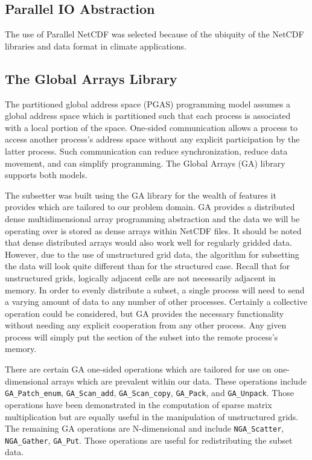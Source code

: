 \subsection{Parallel IO Abstraction}

The use of Parallel NetCDF was selected because of the ubiquity of the NetCDF
libraries and data format in climate applications.

\subsection{The Global Arrays Library}

The partitioned global address space (PGAS) programming model assumes a global
address space which is partitioned such that each process is associated with a
local portion of the space.  One-sided communication allows a process to
access another process's address space without any explicit participation by
the latter process.  Such communication can reduce synchronization, reduce
data movement, and can simplify programming.  The Global Arrays (GA) library
supports both models.

The subsetter was built using the GA library for the wealth of features it
provides which are tailored to our problem domain.  GA provides a distributed
dense multidimensional array programming abstraction and the data we will be
operating over is stored as dense arrays within NetCDF files.  It should be
noted that dense distributed arrays would also work well for regularly gridded
data.  However, due to the use of unstructured grid data, the algorithm for
subsetting the data will look quite different than for the structured case.
Recall that for unstructured grids, logically adjacent cells are not
necessarily adjacent in memory.  In order to evenly distribute a subset, a
single process will need to send a varying amount of data to any number of
other processes.  Certainly a collective operation could be considered, but GA
provides the necessary functionality without needing any explicit cooperation
from any other process.  Any given process will simply put the section of the
subset into the remote process's memory.

There are certain GA one-sided operations which are tailored for use on
one-dimensional arrays which are prevalent within our data.  These operations
include \verb=GA_Patch_enum=, \verb=GA_Scan_add=, \verb=GA_Scan_copy=,
\verb=GA_Pack=, and \verb=GA_Unpack=.  Those operations have been demonstrated
in the computation of sparse matrix multiplication\cite{GA} but are equally
useful in the manipulation of unstructured grids.  The remaining GA operations
are N-dimensional and include \verb=NGA_Scatter=, \verb=NGA_Gather=,
\verb=GA_Put=.  Those operations are useful for redistributing the subset
data.

